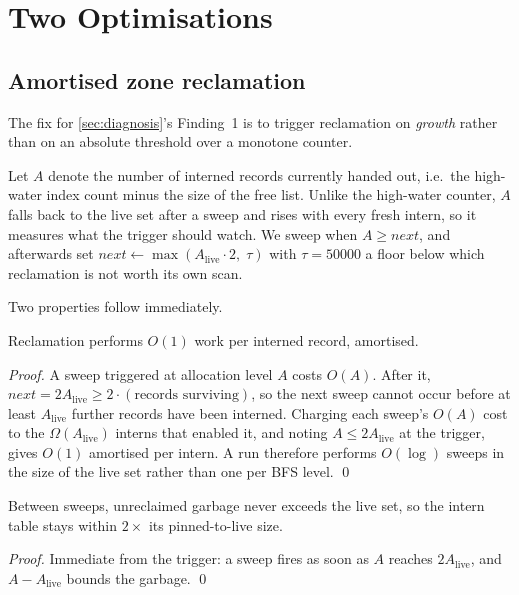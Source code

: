 \section{Two Optimisations}\label{sec:opt}

\subsection{Amortised zone reclamation}\label{sec:gc}

The fix for \cref{sec:diagnosis}'s Finding~1 is to trigger reclamation on
\emph{growth} rather than on an absolute threshold over a monotone counter.

Let $A$ denote the number of interned records currently handed out, i.e.\ the
high-water index count minus the size of the free list.  Unlike the high-water
counter, $A$ falls back to the live set after a sweep and rises with every fresh
intern, so it measures what the trigger should watch.  We sweep when
$A \geq \mathit{next}$, and afterwards set
$\mathit{next} \leftarrow \max(A_{\text{live}} \cdot 2,\; \tau)$ with
$\tau = \num{50000}$ a floor below which reclamation is not worth its own scan.

Two properties follow immediately.

\begin{proposition}\label{prop:gcamort}
Reclamation performs $O(1)$ work per interned record, amortised.
\end{proposition}
\begin{proof}
A sweep triggered at allocation level $A$ costs $O(A)$.  After it,
$\mathit{next} = 2A_{\text{live}} \geq 2 \cdot (\text{records surviving})$, so
the next sweep cannot occur before at least $A_{\text{live}}$ further records
have been interned.  Charging each sweep's $O(A)$ cost to the
$\Omega(A_{\text{live}})$ interns that enabled it, and noting $A \leq
2A_{\text{live}}$ at the trigger, gives $O(1)$ amortised per intern.  A run
therefore performs $O(\log)$ sweeps in the size of the live set rather than one
per BFS level. \qed
\end{proof}

\begin{proposition}\label{prop:gcmem}
Between sweeps, unreclaimed garbage never exceeds the live set, so the intern
table stays within $2\times$ its pinned-to-live size.
\end{proposition}
\begin{proof}
Immediate from the trigger: a sweep fires as soon as $A$ reaches
$2A_{\text{live}}$, and $A - A_{\text{live}}$ bounds the garbage. \qed
\end{proof}

